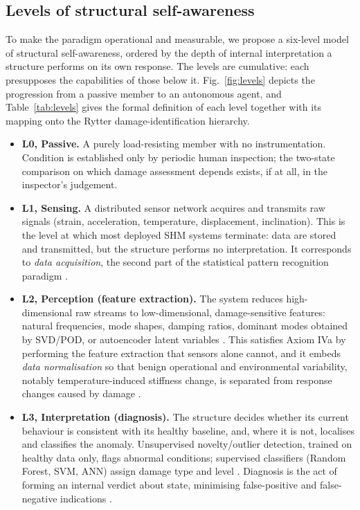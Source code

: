 \subsection{Levels of structural self-awareness}\label{subsec:levels}

To make the paradigm operational and measurable, we propose a six-level model of structural self-awareness, ordered by the depth of internal interpretation a structure performs on its own response. The levels are cumulative: each presupposes the capabilities of those below it. Fig.~\ref{fig:levels} depicts the progression from a passive member to an autonomous agent, and Table~\ref{tab:levels} gives the formal definition of each level together with its mapping onto the Rytter damage-identification hierarchy.

\begin{itemize}
\item \textbf{L0, Passive.} A purely load-resisting member with no instrumentation. Condition is established only by periodic human inspection; the two-state comparison on which damage assessment depends \citep{farrar2013shm} exists, if at all, in the inspector's judgement.
\item \textbf{L1, Sensing.} A distributed sensor network acquires and transmits raw signals (strain, acceleration, temperature, displacement, inclination). This is the level at which most deployed SHM systems terminate: data are stored and transmitted, but the structure performs no interpretation. It corresponds to \textit{data acquisition}, the second part of the statistical pattern recognition paradigm \citep{farrar2013shm}.
\item \textbf{L2, Perception (feature extraction).} The system reduces high-dimensional raw streams to low-dimensional, damage-sensitive features: natural frequencies, mode shapes, damping ratios, dominant modes obtained by SVD/POD, or autoencoder latent variables \citep{farrar2013shm,brunton2019data}. This satisfies Axiom IVa by performing the feature extraction that sensors alone cannot, and it embeds \textit{data normalisation} so that benign operational and environmental variability, notably temperature-induced stiffness change, is separated from response changes caused by damage \citep{farrar2013shm,figueiredo2010machine}.
\item \textbf{L3, Interpretation (diagnosis).} The structure decides whether its current behaviour is consistent with its healthy baseline, and, where it is not, localises and classifies the anomaly. Unsupervised novelty/outlier detection, trained on healthy data only, flags abnormal conditions; supervised classifiers (Random Forest, SVM, ANN) assign damage type and level \citep{farrar2013shm,naser2023ml,sohn2003statistical}. Diagnosis is the act of forming an internal verdict about state, minimising false-positive and false-negative indications \citep{farrar2013shm}.

\end{itemize}
